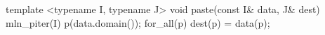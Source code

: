 template <typename I, typename J>
void paste(const I& data, J& dest)
{
mln_piter(I) p(data.domain());
for_all(p)
dest(p) = data(p);
}

